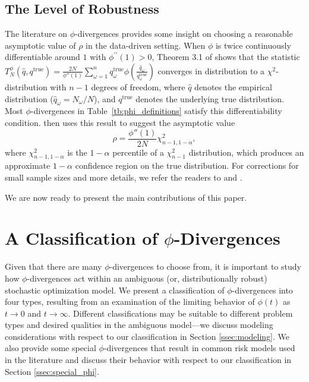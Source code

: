 \documentclass[ijoc,letterpaper]{informs3} %
\newcommand{\qtrue}{q^{\text{true}}}
\begin{document}
\subsection{The Level of Robustness}
\label{ssec:robust_level}

The literature on $\phi$-divergences provides some insight on choosing a reasonable asymptotic value of $\rho$ in the data-driven setting. 
When $\phi$ is twice continuously differentiable around $1$ with $\phi^{\prime \prime}(1)>0$, Theorem 3.1 of \cite{pardo2005statistical} shows that the statistic $T^\phi_N(\hat{q},\qtrue) = \frac{2N}{\phi''(1)} \sum_{\omega=1}^n \qtrue_\omega \phi\left(\frac{\hat{q}_\omega}{\qtrue_\omega}\right)$ converges in distribution to a $\chi^2$-distribution with $n-1$ degrees of freedom, where $\hat{q}$ denotes the empirical distribution ($\hat{q}_\omega = N_\omega/N$), and $\qtrue$ denotes the underlying true distribution.
Most $\phi$-divergences in Table~\ref{tb:phi_definitions} satisfy this differentiability condition.
\cite{bental2011robust} then uses this result to suggest the asymptotic value
\begin{equation} \label{eq:asymptotic_rho}
	\rho = \frac{\phi''(1)}{2N} \chi^2_{n-1,1-\alpha},
\end{equation}
where $\chi^2_{n-1,1-\alpha}$ is the $1-\alpha$ percentile of a $\chi^2_{n-1}$ distribution, which produces an approximate $1-\alpha$ confidence region on the true distribution.
For corrections for small sample sizes and more details, we refer the readers to \citep{pardo2005statistical} and \citep{bental2011robust}. 

We are now ready to present the main contributions of this paper. 

\section{A Classification of $\phi$-Divergences}
\label{sec:classification}

Given that there are many $\phi$-divergences to choose from, it is important to study how $\phi$-divergences act within an ambiguous (or, distributionally robust) stochastic optimization model. 
We present a classification of $\phi$-divergences into four types, resulting from an examination of the limiting behavior of $\phi(t)$ as $t \rightarrow 0$ and $t \rightarrow \infty$.
Different classifications may be suitable to different problem types and desired qualities in the ambiguous model---we discuss modeling considerations with respect to our classification in Section \ref{ssec:modeling}.
We also provide some special $\phi$-divergences that result in common risk models used in the literature and discuss their behavior with respect to our classification in Section \ref{ssec:special_phi}.
\end{document}
